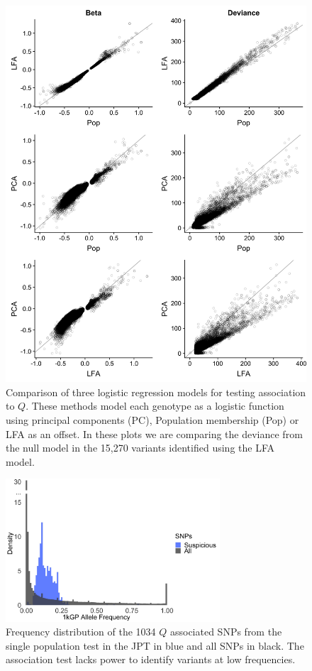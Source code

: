 \documentclass[9pt,article]{template}
\begin{document}
\renewcommand{\thefigure}{S\arabic{figure}}
\setcounter{figure}{0}   	

\begin{figure}
\centering
\includegraphics[width=13cm,keepaspectratio]{../Figures/fits_Significant_Positions_CompareModels.jpg}
\caption{Comparison of three logistic regression models for testing association to $Q$.
These methods model each genotype as a logistic function using principal components (PC), Population membership (Pop) or LFA as an offset.
In these plots we are comparing the deviance from the null model in the 15,270 variants identified using the LFA model.}  
\label{CompareModel}
\end{figure}

\begin{figure}
\centering
\includegraphics[width=8cm,keepaspectratio]{../Figures/histogram_of_sig_snps.jpg}
\caption{Frequency distribution of the 1034 $Q$ associated SNPs from the single population test in the JPT in blue and all SNPs in black. The association test lacks power to identify variants at low frequencies.}  
\label{histogram_of_sig_snps}
\end{figure}
\end{document}
